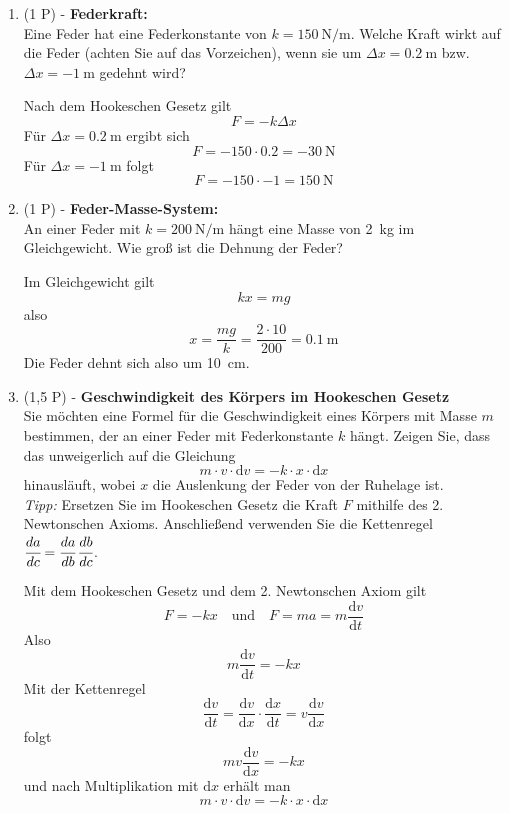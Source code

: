 \documentclass[11pt, a4paper]{article}
\begin{document}
\begin{enumerate}[label=\textbf{\arabic*.},itemsep=0.50cm]
    \item (1 P) - \textbf{Federkraft:} \\
    Eine Feder hat eine Federkonstante von $k = \SI{150}{\newton\per\meter}$. Welche Kraft wirkt auf die Feder (achten Sie auf das Vorzeichen), wenn sie um $\Delta x = \SI{0.2}{\meter}$ bzw. $\Delta x = \SI{-1}{\meter}$ gedehnt wird?
    \begin{solutionbox}
        Nach dem Hookeschen Gesetz gilt
        \[
        F = -k \Delta x
        \]
        Für $\Delta x = \SI{0.2}{\meter}$ ergibt sich
        \[
        F = -150 \cdot \num{0.2} = \SI{-30}{\newton}
        \]
        Für $\Delta x = \SI{-1}{\meter}$ folgt
        \[
        F = -150 \cdot \num{-1} = \SI{150}{\newton}
        \]
    \end{solutionbox}

    \item (1 P) - \textbf{Feder-Masse-System:} \\
    An einer Feder mit $k = \SI{200}{\newton\per\meter}$ hängt eine Masse von \SI{2}{\kilogram} im Gleichgewicht. Wie groß ist die Dehnung der Feder?
    \begin{solutionbox}
        Im Gleichgewicht gilt
        \[
        kx = mg
        \]
        also
        \[
        x = \frac{mg}{k} = \frac{2 \cdot 10}{200} = \SI{0.1}{\meter}
        \]
        Die Feder dehnt sich also um \SI{10}{\centi\meter}.
    \end{solutionbox}

    \item (1,5 P) - \textbf{Geschwindigkeit des Körpers im Hookeschen Gesetz} \\
    Sie möchten eine Formel für die Geschwindigkeit eines Körpers mit Masse $m$ bestimmen, der an einer Feder mit Federkonstante $k$ hängt. Zeigen Sie, dass das unweigerlich auf die Gleichung
    \begin{equation*}
        m \cdot v \cdot \mathrm{d}v = -k \cdot x \cdot \mathrm{d}x
    \end{equation*}
    hinausläuft, wobei $x$ die Auslenkung der Feder von der Ruhelage ist. \\
    \textit{Tipp: }Ersetzen Sie im Hookeschen Gesetz die Kraft $F$ mithilfe des 2. Newtonschen Axioms. Anschließend verwenden Sie die Kettenregel $\cfrac{da}{dc} = \cfrac{da}{db} \, \cfrac{db}{dc}$.
    \begin{solutionbox}
        Mit dem Hookeschen Gesetz und dem 2. Newtonschen Axiom gilt
        \[
        F = -kx \quad \text{und} \quad F = m a = m \frac{\mathrm{d}v}{\mathrm{d}t}
        \]
        Also
        \[
        m \frac{\mathrm{d}v}{\mathrm{d}t} = -kx
        \]
        Mit der Kettenregel
        \[
        \frac{\mathrm{d}v}{\mathrm{d}t} = \frac{\mathrm{d}v}{\mathrm{d}x} \cdot \frac{\mathrm{d}x}{\mathrm{d}t} = v \frac{\mathrm{d}v}{\mathrm{d}x}
        \]
        folgt
        \[
        m v \frac{\mathrm{d}v}{\mathrm{d}x} = -kx
        \]
        und nach Multiplikation mit $\mathrm{d}x$ erhält man
        \[
        m \cdot v \cdot \mathrm{d}v = -k \cdot x \cdot \mathrm{d}x
        \]
    \end{solutionbox}


\end{enumerate}
\end{document}
